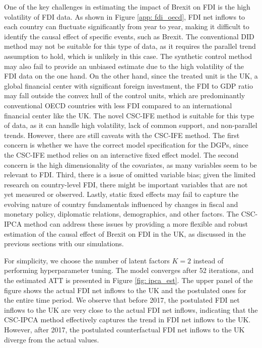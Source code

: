 \documentclass[12pt]{article}
\begin{document}
One of the key challenges in estimating the impact of Brexit on FDI is the high volatility of FDI data. As shown in Figure \ref{app: fdi_oecd}, FDI net inflows to each country can fluctuate significantly from year to year, making it difficult to identify the causal effect of specific events, such as Brexit. The conventional DID method may not be suitable for this type of data, as it requires the parallel trend assumption to hold, which is unlikely in this case. The synthetic control method may also fail to provide an unbiased estimate due to the high volatility of the FDI data on the one hand. On the other hand, since the treated unit is the UK, a global financial center with significant foreign investment, the FDI to GDP ratio may fall outside the convex hull of the control units, which are predominantly conventional OECD countries with less FDI compared to an international financial center like the UK. The novel CSC-IFE method is suitable for this type of data, as it can handle high volatility, lack of common support, and non-parallel trends. However, there are still caveats with the CSC-IFE method. The first concern is whether we have the correct model specification for the DGPs, since the CSC-IFE method relies on an interactive fixed effect model. The second concern is the high dimensionality of the covariates, as many variables seem to be relevant to FDI. Third, there is a issue of omitted variable bias; given the limited research on country-level FDI, there might be important variables that are not yet measured or observed. Lastly, static fixed effects may fail to capture the evolving nature of country fundamentals influenced by changes in fiscal and monetary policy, diplomatic relations, demographics, and other factors. The CSC-IPCA method can address these issues by providing a more flexible and robust estimation of the causal effect of Brexit on FDI in the UK, as discussed in the previous sections with our simulations.

For simplicity, we choose the number of latent factors $K = 2$ instead of performing hyperparameter tuning. The model converges after 52 iterations, and the estimated ATT is presented in Figure \ref{fig: ipca_est}. The upper panel of the figure shows the actual FDI net inflows to the UK and the postulated ones for the entire time period. We observe that before 2017, the postulated FDI net inflows to the UK are very close to the actual FDI net inflows, indicating that the CSC-IPCA method effectively captures the trend in FDI net inflows to the UK. However, after 2017, the postulated counterfactual FDI net inflows to the UK diverge from the actual values. 
\end{document}
